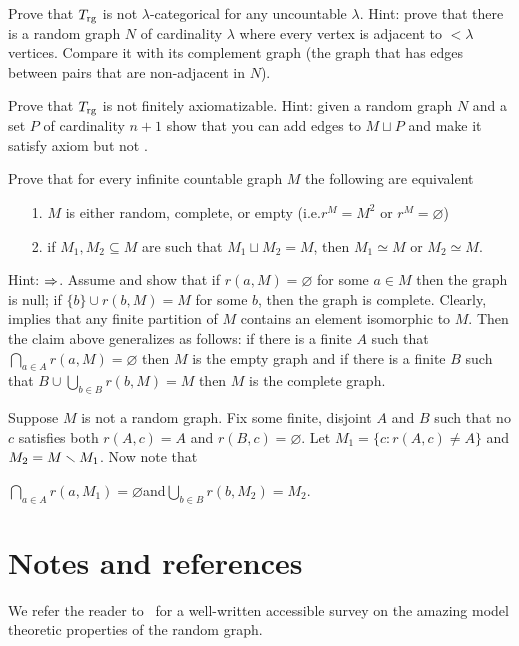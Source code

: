 \begin{exercise}
Prove that $T_{\rm rg}$ is not $\lambda$-categorical for any uncountable $\lambda$.
Hint: prove that there is a random graph $N$ of cardinality $\lambda$ where every vertex is adjacent to $<\lambda$ vertices.
Compare it with its complement graph (the graph that has edges between pairs that are non-adjacent in $N$).
\end{exercise}

\begin{exercise}
Prove that $T_{\rm rg}$ is not finitely axiomatizable.
Hint: given a random graph $N$ and a set $P$ of cardinality $n+1$ show that you can add edges to $M\sqcup P$ and make it satisfy axiom  but not .
\end{exercise}

\begin{exercise}\label{ex_CameronRG}
Prove that for every infinite countable graph $M$ the following are equivalent
\begin{itemize}
\item[1.] $M$ is either random, complete, or empty (i.e.\@ $r^M=M^2$ or $r^M=\varnothing$)
\item[2.] if $M_1,M_2\subseteq M$ are such that $M_1\sqcup M_2=M$, then $M_1\simeq M$ or $M_2\simeq M$.
\end{itemize}
Hint: $\Rightarrow$. Assume  and show that if $r(a,M)=\varnothing$ for some $a\in M$ then the graph is null; if $\{b\}\cup r(b,M)=M$ for some $b$, then the graph is complete.
Clearly,  implies that any finite partition of $M$ contains an element isomorphic to $M$.
Then the claim above generalizes as follows: if there is a finite $A$ such that $\bigcap_{a\in A}r(a, M)=\varnothing$ then $M$ is the empty graph and if there is a finite $B$ such that $B\cup\bigcup_{b\in B}r(b,M)=M$ then $M$ is the complete graph.

Suppose $M$ is not a random graph.
Fix some finite, disjoint $A$ and $B$ such that no $c$ satisfies both $r(A,c)= A$ and $r(B,c)=\varnothing$.
Let $M_1=\{c:r(A,c)\neq A\}$ and $M_2=M\smallsetminus M_1$.
Now note that 

\hfil$\displaystyle\bigcap_{a\in A}r(a, M_1)=\varnothing$\hfil and\hfil $\displaystyle\bigcup_{b\in B}r(b, M_2)=M_2$.
\end{exercise}

\section{Notes and references}

We refer the reader to~\cite{Cameron} for a well-written accessible survey on the amazing model theoretic properties of the random graph.

\begin{biblist}[]\normalsize
\end{biblist}